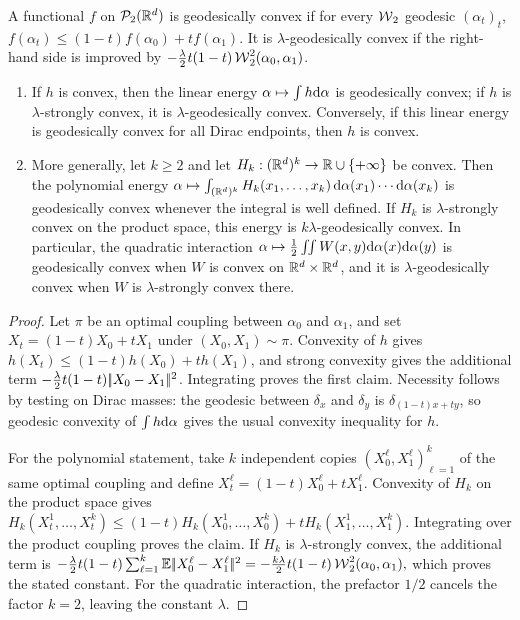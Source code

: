 \begin{defn}\label{def-geodesic-convexity}
A functional $f$ on $\mathcal{P}_2(\mathbb{R}^d)$ is geodesically convex if for every $\operatorname{\mathcal{W}}_2$ geodesic $(\alpha_t)_t$, \(f(\alpha_t)\leq (1-t)f(\alpha_0)+t f(\alpha_1).\)
It is $\lambda$-geodesically convex if the right-hand side is improved by $-\frac{\lambda}{2}t(1-t)\operatorname{\mathcal{W}}_2^2(\alpha_0,\alpha_1)$.
\end{defn}
\begin{prop}\label{prop-basic-geodesic-convexity}
\begin{enumerate}
\item If $h$ is convex, then the linear energy $\alpha\mapsto\int h\mathrm{d}\alpha$ is geodesically convex; if $h$ is $\lambda$-strongly convex, it is $\lambda$-geodesically convex. Conversely, if this linear energy is geodesically convex for all Dirac endpoints, then $h$ is convex.
\item More generally, let \(k\geq2\) and let \(H_k:(\mathbb{R}^d)^k\to\mathbb{R}\cup\{+\infty\}\) be convex. Then the polynomial energy
\(\alpha\mapsto \int_{(\mathbb{R}^d)^k} H_k(x_1,\ldots,x_k)\,\mathrm{d}\alpha(x_1)\cdots\mathrm{d}\alpha(x_k)\)
is geodesically convex whenever the integral is well defined. If $H_k$ is $\lambda$-strongly convex on the product space, this energy is $k\lambda$-geodesically convex. In particular, the quadratic interaction
\(\alpha\mapsto\frac12\iint W(x,y)\mathrm{d}\alpha(x)\mathrm{d}\alpha(y)\)
is geodesically convex when \(W\) is convex on \(\mathbb{R}^d\times\mathbb{R}^d\), and it is $\lambda$-geodesically convex when $W$ is $\lambda$-strongly convex there.
\end{enumerate}
\end{prop}
\begin{proof}
Let \(\pi\) be an optimal coupling between \(\alpha_0\) and \(\alpha_1\), and set \(X_t=(1-t)X_0+tX_1\) under \((X_0,X_1)\sim\pi\). Convexity of \(h\) gives \(h(X_t)\leq(1-t)h(X_0)+t h(X_1)\), and strong convexity gives the additional term \(-\frac{\lambda}{2}t(1-t)|\!| X_0-X_1 |\!|^2\). Integrating proves the first claim. Necessity follows by testing on Dirac masses: the geodesic between \(\delta_x\) and \(\delta_y\) is \(\delta_{(1-t)x+ty}\), so geodesic convexity of \(\int h\mathrm{d}\alpha\) gives the usual convexity inequality for \(h\).

For the polynomial statement, take \(k\) independent copies \((X_0^\ell,X_1^\ell)_{\ell=1}^k\) of the same optimal coupling and define \(X_t^\ell=(1-t)X_0^\ell+tX_1^\ell\). Convexity of \(H_k\) on the product space gives
\(H_k(X_t^1,\ldots,X_t^k) \leq (1-t)H_k(X_0^1,\ldots,X_0^k)+tH_k(X_1^1,\ldots,X_1^k).\)
Integrating over the product coupling proves the claim. If $H_k$ is $\lambda$-strongly convex, the additional term is
\(-\frac{\lambda}{2}t(1-t) \sum_{\ell=1}^k\mathbb{E}|\!| X_0^\ell-X_1^\ell |\!|^2 = -\frac{k\lambda}{2}t(1-t)\operatorname{\mathcal{W}}_2^2(\alpha_0,\alpha_1),\)
which proves the stated constant. For the quadratic interaction, the prefactor $1/2$ cancels the factor $k=2$, leaving the constant $\lambda$.
\end{proof}
